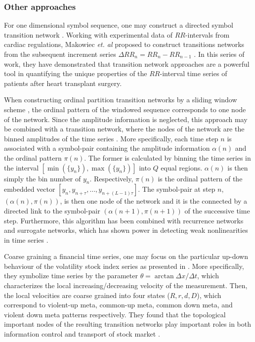 		\subsubsection{Other approaches}
		For one dimensional symbol sequence, one may construct a directed symbol transition network \cite{Emmert2012}. Working with experimental data of $RR$-intervals from cardiac regulations, Makowiec {\textit{ et. al}} proposed to construct transitions networks from the subsequent increment series $\Delta RR_n = RR_n - RR_{n-1}$ \cite{Makowiec2013,Makowiec2013b,Makowiec2014b,Makowiec2015,Makowiec2015b,Makowiec2016}. In this series of work, they have demonstrated that transition network approaches are a powerful tool in quantifying the unique properties of the $RR$-interval time series of patients after heart transplant surgery. 
		
		When constructing ordinal partition transition networks by a sliding window scheme \cite{Small2013}, the ordinal pattern of the windowed sequence corresponds to one node of the network. Since the amplitude information is neglected, this approach may be combined with a transition network, where the nodes of the network are the binned amplitudes of the time series \cite{Sun2014}. More specifically, each time step $n$ is associated with a symbol-pair containing the amplitude information $\alpha (n)$ and the ordinal pattern $\pi (n)$. The former is calculated by binning the time series in the interval $[\min(\{ y_n\}), \max(\{ y_n \})]$ into $Q$ equal regions.  $\alpha(n)$ is then simply the bin number of $y_n$. Respectively, $\pi(n)$ is the ordinal pattern of the embedded vector $[y_n, y_{n+\tau}, \dots, y_{n+(L-1)\tau}]$. The symbol-pair at step $n$, $(\alpha(n), \pi(n))$, is then one node of the network and it is the connected by a directed link to the symbol-pair $(\alpha(n+1), \pi(n+1))$ of the successive time step. Furthermore, this algorithm has been combined with recurrence networks and surrogate networks, which has shown power in detecting weak nonlinearities in time series \cite{Laut2016}. 
		
		Coarse graining a financial time series, one may focus on the particular up-down behaviour of the volatility stock index series as presented in \cite{Li2006b,Li2007a}. More specifically, they symbolize time series by the parameter $\theta = \arctan \Delta x / \Delta t$, which characterizes the local increasing/decreasing velocity of the measurement. Then, the local velocities are coarse grained into four states ($R, r, d, D$), which correspond to violent-up meta, common-up meta, common down meta, and violent down meta patterns respectively. They found that the topological important nodes of the resulting transition networks play important roles in both information control and transport of stock market \cite{Li2007a}. 
		
